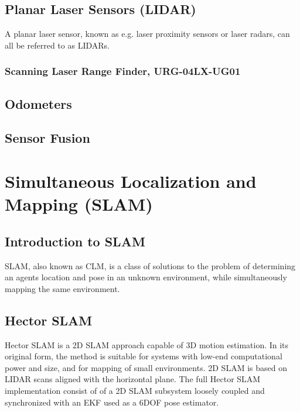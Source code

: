 

\subsection{Planar Laser Sensors (LIDAR)}

A planar laser sensor, known as e.g. laser proximity sensors or laser radars, can all be referred to as LIDARs. 

\subsubsection{Scanning Laser Range Finder, URG-04LX-UG01}


\subsection{Odometers}

\subsection{Sensor Fusion}


\section{Simultaneous Localization and Mapping (SLAM)}

\subsection{Introduction to SLAM}

\ac{SLAM}, also known as \ac{CLM}, is a class of solutions to the problem of determining an agents location and pose in an unknown environment, while simultaneously mapping the same environment.

\subsection{Hector SLAM}
\label{sec:hector}
Hector SLAM \cite{KohlbrecherMeyerStrykKlingaufFlexibleSlamSystem2011} is a 2D \ac{SLAM} approach capable of 3D motion estimation. In its original form, the method is suitable for systems with low-end computational power and size, and for mapping of small environments. 2D \ac{SLAM} is based on \ac{LIDAR} scans aligned with the horizontal plane. The full Hector SLAM implementation consist of of a 2D \ac{SLAM} subsystem loosely coupled and synchronized with an \ac{EKF} used as a  6DOF pose estimator. 

